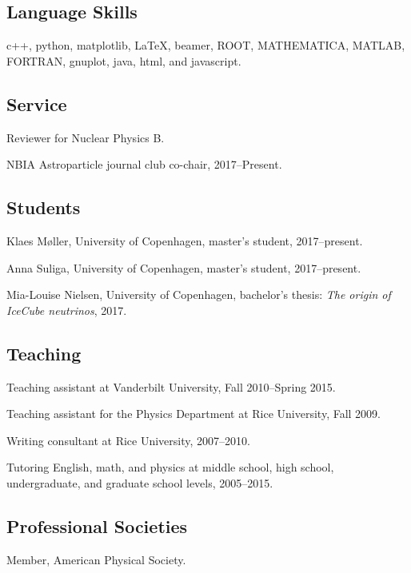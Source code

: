 \documentclass[letterpaper]{article}
\renewenvironment{itemize}{
\begin{list}{}{
\setlength{\leftmargin}{.5em}}}{
\end{list}}
\begin{document}
\subsection*{Language Skills}
\begin{itemize}
\item 
c++, python, matplotlib, \LaTeX, beamer, ROOT, MATHEMATICA, MATLAB, FORTRAN, gnuplot, java, html, and javascript.
\end{itemize}

\subsection*{Service}
\begin{itemize}
\item Reviewer for Nuclear Physics B.
\item NBIA Astroparticle journal club co-chair, 2017--Present.
\end{itemize}

\subsection*{Students}
\begin{itemize}
\item Klaes M\o ller, University of Copenhagen, master's student, 2017--present.
\item Anna Suliga, University of Copenhagen, master's student, 2017--present.
\item Mia-Louise Nielsen, University of Copenhagen, bachelor's thesis: \emph{The origin of IceCube neutrinos}, 2017.
\end{itemize}

\subsection*{Teaching}
\begin{itemize}
\item Teaching assistant at Vanderbilt University, Fall 2010--Spring 2015.
\item Teaching assistant for the Physics Department at Rice University, Fall 2009.
\item Writing consultant at Rice University, 2007--2010.
\item Tutoring English, math, and physics at middle school, high school, undergraduate, and graduate school levels, 2005--2015.
\end{itemize}

\subsection*{Professional Societies}
\begin{itemize}
\item Member, American Physical Society.
\end{itemize}
\end{document}
